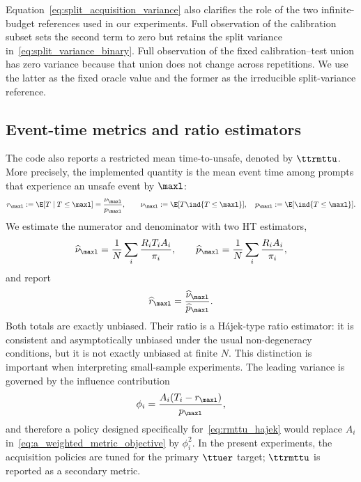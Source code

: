 Equation~\eqref{eq:split_acquisition_variance} also clarifies the role of the
two infinite-budget references used in our experiments.  Full observation of
the calibration subset sets the second term to zero but retains the split
variance in~\eqref{eq:split_variance_binary}.  Full observation of the fixed
calibration--test union has zero variance because that union does not change
across repetitions.  We use the latter as the fixed oracle value and the
former as the irreducible split-variance reference.

\subsection{Event-time metrics and ratio estimators}

The code also reports a restricted mean time-to-unsafe, denoted by
$\ttrmttu$.  More precisely, the implemented quantity is the mean event time
among prompts that experience an unsafe event by $\maxl$:
\begin{equation}
    r_{\maxl}
    :=\E[T\mid T\leq\maxl]
    =\frac{\nu_{\maxl}}{p_{\maxl}},
    \qquad
    \nu_{\maxl}:=\E[T\ind{T\leq\maxl}],
    \quad
    p_{\maxl}:=\E[\ind{T\leq\maxl}].
    \label{eq:rmttu_ratio_target}
\end{equation}
We estimate the numerator and denominator with two HT estimators,
\begin{equation}
    \widehat\nu_{\maxl}
    =\frac{1}{N}\sum_i\frac{R_iT_iA_i}{\pi_i},
    \qquad
    \widehat p_{\maxl}
    =\frac{1}{N}\sum_i\frac{R_iA_i}{\pi_i},
\end{equation}
and report
\begin{equation}
    \widehat r_{\maxl}
    =\frac{\widehat\nu_{\maxl}}{\widehat p_{\maxl}}.
    \label{eq:rmttu_hajek}
\end{equation}
Both totals are exactly unbiased.  Their ratio is a H\'ajek-type ratio
estimator: it is consistent and asymptotically unbiased under the usual
non-degeneracy conditions, but it is not exactly unbiased at finite $N$.
This distinction is important when interpreting small-sample experiments.
The leading variance is governed by the influence contribution
\begin{equation}
    \phi_i=\frac{A_i(T_i-r_{\maxl})}{p_{\maxl}},
\end{equation}
and therefore a policy designed specifically for~\eqref{eq:rmttu_hajek}
would replace $A_i$ in~\eqref{eq:a_weighted_metric_objective} by
$\phi_i^2$.  In the present experiments, the acquisition policies are tuned
for the primary $\ttuer$ target; $\ttrmttu$ is reported as a secondary
metric.

